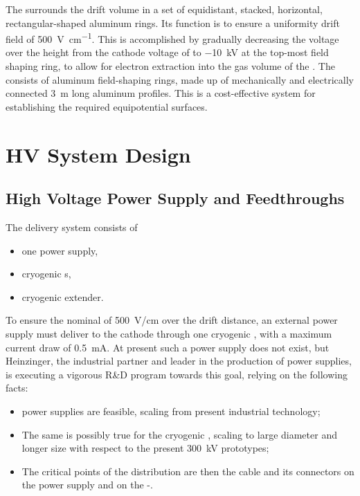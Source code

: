 The  surrounds the drift volume in a set of equidistant, stacked, horizontal, rectangular-shaped aluminum rings. Its function is to ensure a uniformity drift field of \SI{500}{\V\per\cm}. This is accomplished by gradually decreasing the voltage over the \tpcheight height from the cathode voltage of \dptargetdriftvoltneg to \SI{-10}{\kV} at the top-most field shaping ring, to allow for electron extraction into the gas volume of the . The  consists of aluminum field-shaping rings, made up of mechanically and electrically connected \SI{3}{m} long aluminum profiles.  
This is a cost-effective system for establishing the required equipotential surfaces. 

\section{HV System Design}
\label{sec:fddp-hv-design}

\subsection {High Voltage Power Supply and Feedthroughs}
The  delivery system consists of
\begin{itemize}
\item one power supply,
\item {} cryogenic \fdth{}s,
\item {} cryogenic extender.
\end{itemize}

To ensure the nominal \efield of \SI{500}{V/cm} over  the \dpmaxdrift drift distance, an external power supply must deliver \dptargetdriftvoltneg to  the cathode through one  cryogenic \fdth, with a maximum current draw of \SI{0.5}{\milli\ampere}.
At present such a power supply does not exist, but  Heinzinger, the industrial partner and leader in the production of  power supplies, is executing a vigorous R\&D program towards this goal, relying on the following facts:

\begin{itemize}
\item \dptargetdriftvoltpos power supplies are feasible, scaling from present industrial technology;
\item The same is possibly true for the  cryogenic \fdth, scaling to large diameter and longer size with respect to the present \SI{300}{\kV} prototypes;
\item The critical points of the  distribution are then the cable and its connectors on the power supply and on the -\fdth. 
\end{itemize}

